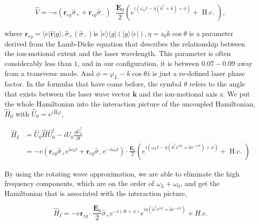 \begin{equation}
    \hat{V}=-e\left(\mathbf{r}_{e g} \hat{\sigma}_{+}+\mathbf{r}_{e g} \hat{\sigma}_{-}\right) \cdot \frac{\mathbf{E}_0}{2}\left(e^{i\left(\omega_L t-\eta\left(\hat{a}^{\dagger}+\hat{a}\right)+\phi\right)}+\text { H.c. }\right),
\end{equation}

where $\mathbf{r}_{e g}=\langle e|\hat{\mathbf{r}}| g\rangle, \hat{\sigma}_{+}\left(\hat{\sigma}_{-}\right)$is $|e\rangle\langle g|(|g\rangle\langle e|), \eta=z_0 k \cos \theta$ is a parameter derived from the Lamb-Dicke equation that describes the relationship between the ion-motional extent and the laser wavelength. This parameter is often considerably less than $1$, and in our configuration, it is between $0.07-0.09$ away from a transverse mode. And $\phi = \varphi_L - k\cos{\theta} \bar{z}$ is just a re-defined laser phase factor. In the formulas that have come before, the symbol $\theta$ refers to the angle that exists between the laser wave vector $\mathbf{k}$ and the ion-motional axis z. We put the whole Hamiltonian into the interaction picture of the uncoupled Hamiltonian, $\hat{H}_0$ with $\hat{U}_0= e^{i \hat{H}_0 t}$,

\begin{equation}
    \begin{aligned}
        \hat{H}_I & =\hat{U}_0 \hat{H} \hat{U}_0^{\dagger}-i \hat{U}_0 \frac{\partial \hat{U}_0^{\dagger}}{\partial t}                                                                                                                                                                               \\
                  & =-e\left(\mathbf{r}_{e g} \hat{\sigma}_{+} e^{i \omega_0 t}+\mathbf{r}_{e g} \hat{\sigma}_{-} e^{-i \omega_0 t}\right) \cdot \frac{\mathbf{E}_0}{2}\left(e^{i\left(\omega_L t-\eta\left(\hat{a}^{\dagger} e^{i v t}+\hat{a} e^{-i v t}\right)+\phi\right)}+\text { H.c. }\right)
    \end{aligned}
\end{equation}

By using the rotating wave approximation, we are able to eliminate the high frequency components, which are on the order of $\omega_L+\omega_0$, and get the Hamiltonian that is associated with the interaction picture,

\begin{equation}
    \hat{H}_I=-e \mathbf{r}_{e g} \cdot \frac{\mathbf{E}_0}{2} \hat{\sigma}_{+} e^{-i(\delta t+\phi)} e^{i \eta\left(\hat{a}^{\dagger} e^{i v t}+\hat{a} e^{-i v t}\right)}+H . c .
\end{equation}

